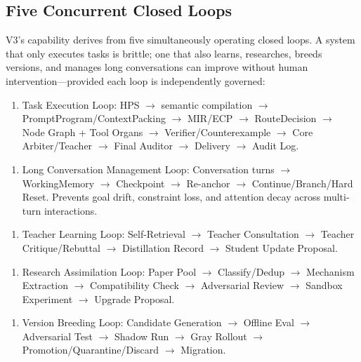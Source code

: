 \documentclass[12pt,a4paper]{article}
\begin{document}
\subsection{Five Concurrent Closed Loops}


V3's capability derives from five simultaneously operating closed loops. A system that only executes tasks is brittle; one that also learns, researches, breeds versions, and manages long conversations can improve without human intervention---provided each loop is independently governed:

\begin{enumerate}
  \item Task Execution Loop: HPS $\rightarrow$ semantic compilation $\rightarrow$ PromptProgram/ContextPacking $\rightarrow$ MIR/ECP $\rightarrow$ RouteDecision $\rightarrow$ Node Graph + Tool Organs $\rightarrow$ Verifier/Counterexample $\rightarrow$ Core Arbiter/Teacher $\rightarrow$ Final Auditor $\rightarrow$ Delivery $\rightarrow$ Audit Log.
\end{enumerate}

\begin{enumerate}
  \item Long Conversation Management Loop: Conversation turns $\rightarrow$ WorkingMemory $\rightarrow$ Checkpoint $\rightarrow$ Re-anchor $\rightarrow$ Continue/Branch/Hard Reset. Prevents goal drift, constraint loss, and attention decay across multi-turn interactions.
\end{enumerate}

\begin{enumerate}
  \item Teacher Learning Loop: Self-Retrieval $\rightarrow$ Teacher Consultation $\rightarrow$ Teacher Critique/Rebuttal $\rightarrow$ Distillation Record $\rightarrow$ Student Update Proposal.
\end{enumerate}

\begin{enumerate}
  \item Research Assimilation Loop: Paper Pool $\rightarrow$ Classify/Dedup $\rightarrow$ Mechanism Extraction $\rightarrow$ Compatibility Check $\rightarrow$ Adversarial Review $\rightarrow$ Sandbox Experiment $\rightarrow$ Upgrade Proposal.
\end{enumerate}

\begin{enumerate}
  \item Version Breeding Loop: Candidate Generation $\rightarrow$ Offline Eval $\rightarrow$ Adversarial Test $\rightarrow$ Shadow Run $\rightarrow$ Gray Rollout $\rightarrow$ Promotion/Quarantine/Discard $\rightarrow$ Migration.
\end{enumerate}
\end{document}
